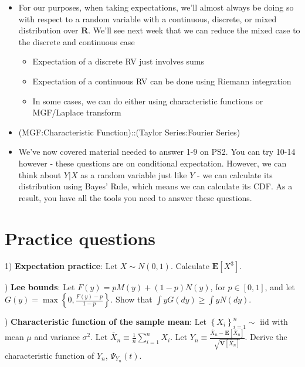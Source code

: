 \documentclass[12pt,english]{article}
\begin{document}
\begin{itemize}
	\item For our purposes, when taking expectations, we'll almost always be doing so with respect to a random variable with a continuous, discrete, or mixed distribution over $\mathbf{R}$. We'll see next week that we can reduce the mixed case to the discrete and continuous case
	\begin{itemize}
		\item Expectation of a discrete RV just involves sums
		\item Expectation of a continuous RV can be done using Riemann integration
		\item In some cases, we can do either using characteristic functions or MGF/Laplace transform
	\end{itemize}
	\item (MGF:Characteristic Function)::(Taylor Series:Fourier Series)
	\item We've now covered material needed to answer 1-9 on PS2. You can try 10-14 however - these questions are on conditional expectation. However, we can think about $Y | X$ as a random variable just like $Y$ - we can calculate its distribution using Bayes' Rule, which means we can calculate its CDF. As a result, you have all the tools you need to answer these questions.
\end{itemize}

\section{Practice questions}

1) \textbf{Expectation practice}: Let $X \sim N(0, 1)$. Calculate $\mathbf{E}[X^{3}]$.

\vspace{1em}
) \textbf{Lee bounds}: Let $F(y) = pM(y) + (1 - p)N(y)$, for $p \in [0, 1]$, and let $G(y) = \max \left\{ 0, \frac{F(y) - p}{1 - p} \right\}$. Show that $\int y G(dy) \geq \int y N(dy)$.

\vspace{1em}
) \textbf{Characteristic function of the sample mean}: Let $\left\{ X_{i} \right\}_{i=1}^{n} \sim$ iid with mean $\mu$ and variance $\sigma^{2}$. Let $\overline{X}_{n} \equiv \frac{1}{n} \sum_{i=1}^{n} X_{i}$. Let $Y_{n} \equiv \frac{\overline{X}_{n} - \mathbf{E} \left[\overline{X}_{n} \right]}{\sqrt{\mathbf{V} \left[ \overline{X}_{n} \right]}}$. Derive the characteristic function of $Y_{n}$, $\Psi_{Y_{n}}(t)$.
\end{document}
